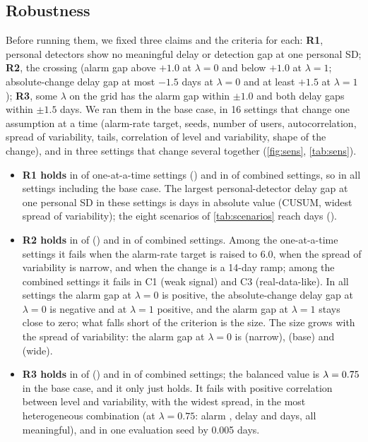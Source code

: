 \documentclass[11pt,a4paper]{article}
\begin{document}
\subsection{Robustness}\label{sec:robust}
Before running them, we fixed three claims and the criteria for each: \textbf{R1}, personal detectors show no meaningful delay or detection gap at one personal SD; \textbf{R2}, the crossing (alarm gap above $+1.0$ at $\lambda=0$ and below $+1.0$ at $\lambda=1$; absolute-change delay gap at most $-1.5$ days at $\lambda=0$ and at least $+1.5$ at $\lambda=1$); \textbf{R3}, some $\lambda$ on the grid has the alarm gap within $\pm1.0$ and both delay gaps within $\pm1.5$ days. We ran them in the base case, in 16 settings that change one assumption at a time (alarm-rate target, seeds, number of users, autocorrelation, spread of variability, tails, correlation of level and variability, shape of the change), and in three settings that change several together (\cref{fig:sens}, \cref{tab:sens}).
\begin{itemize}
  \item \textbf{R1 holds} in \SensRoneOk{} of \SensN{} one-at-a-time settings (\SensRoneLabel) and in \CombRoneOk{} of \CombN{} combined settings, so in all \AllSettings{} settings including the base case. The largest personal-detector delay gap at one personal SD in these \AllSettings{} settings is \SensMaxPersonal{} days in absolute value (CUSUM, widest spread of variability); the eight scenarios of \cref{tab:scenarios} reach \ScenMaxPersonalRmd{} days (\ScenMaxPersonalWhich).
  \item \textbf{R2 holds} in \SensRtwoOk{} of \SensN{} (\SensRtwoLabel) and in \CombRtwoOk{} of \CombN{} combined settings. Among the one-at-a-time settings it fails when the alarm-rate target is raised to 6.0, when the spread of variability is narrow, and when the change is a 14-day ramp; among the combined settings it fails in C1 (weak signal) and C3 (real-data-like). In all \AllSettings{} settings the alarm gap at $\lambda=0$ is positive, the absolute-change delay gap at $\lambda=0$ is negative and at $\lambda=1$ positive, and the alarm gap at $\lambda=1$ stays close to zero; what falls short of the criterion is the size. The size grows with the spread of variability: the alarm gap at $\lambda=0$ is \SSpreadNarrowAlarmZero{} (narrow), \SBaseAlarmZero{} (base) and \SSpreadWideAlarmZero{} (wide).
  \item \textbf{R3 holds} in \SensRthreeOk{} of \SensN{} (\SensRthreeLabel) and in \CombRthreeOk{} of \CombN{} combined settings; the balanced value is $\lambda=0.75$ in the base case, and it only just holds. It fails with positive correlation between level and variability, with the widest spread, in the most heterogeneous combination (at $\lambda=0.75$: alarm \CombStressThreeQuartersAlarm, delay \CombStressThreeQuartersRmdStd{} and \CombStressThreeQuartersRmdAbs{} days, all meaningful), and in one evaluation seed by 0.005 days.
\end{itemize}
\end{document}
